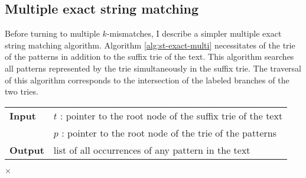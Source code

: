 

\subsection{Multiple exact string matching}
\label{sec:index:algo:multiexact}

Before turning to multiple $k$-mismatches, I describe a simpler multiple exact string matching algorithm.
Algorithm \ref{alg:st-exact-multi} necessitates of the trie of the patterns in addition to the suffix trie of the text.
This algorithm searches all patterns represented by the trie simultaneously in the suffix trie.
The traversal of this algorithm corresponds to the intersection of the labeled branches of the two tries.

\begin{figure*}[b]
\begin{center}
\begin{minipage}[t]{.8\textwidth}
\begin{algorithm}[H]
\begin{tabular}{ll}
\textbf{Input}  & $t$ : pointer to the root node of the suffix trie of the text\\
 			    & $p$ : pointer to the root node of the trie of the patterns\\
\textbf{Output} & list of all occurrences of any pattern in the text\\
\end{tabular}
\begin{algorithmic}[1]
	\State \Report {} $\times$ 
\Else
	\State {}
	\Repeat
			\State {}
			\State {}
		\EndIf
\EndIf
\end{algorithmic}
\label{alg:st-exact-multi}
\end{algorithm}
\end{minipage}
\end{center}
\end{figure*}

